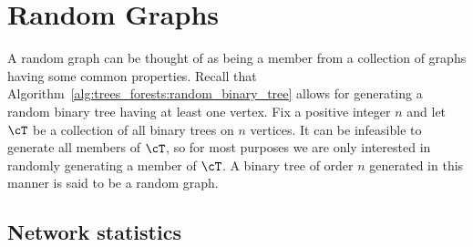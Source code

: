 
\chapter{Random Graphs}
\label{chap:random_graphs}

A random graph can be thought of as being a member
from a collection of graphs having some common properties. Recall that
Algorithm~\ref{alg:trees_forests:random_binary_tree} allows for
generating a random binary tree having at least one vertex. Fix a
positive integer $n$ and let $\cT$ be a collection of all binary trees
on $n$ vertices. It can be infeasible to generate all members of
$\cT$, so for most purposes we are only interested in randomly
generating a member of $\cT$. A binary tree of order $n$ generated in
this manner is said to be a random graph.




\section{Network statistics}

